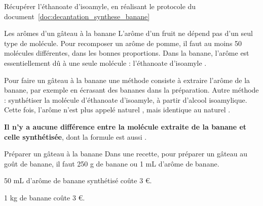 \mesure Récupérer l'éthanoate d'isoamyle, en réalisant le protocole du document~\ref{doc:decantation_synthese_banane}


\bigskip
\begin{doc}{Les arômes d'un gâteau à la banane}
  L'arôme d'un fruit ne dépend pas d'un seul type de molécule.
  Pour recomposer un arôme de pomme, il faut au moins 50 molécules différentes, dans les bonnes proportions.
  Dans la banane, l'arôme est essentiellement dû à une seule molécule : l'éthanoate d'isoamyle .
  
  Pour faire un gâteau à la banane une méthode consiste à extraire l'arôme de la banane, par exemple en écrasant des bananes dans la préparation.
  Autre méthode : synthétiser la molécule d'éthanoate d'isoamyle, à partir d'alcool isoamylique.
  Cette fois, l'arôme n'est plus appelé \og naturel \fg, mais \og identique au naturel \fg.
  
  \textbf{Il n'y a aucune différence entre la molécule extraite de la banane et celle synthétisée}, dont la formule est aussi .
\end{doc}


\newpage
\begin{doc}{Préparer un gâteau à la banane}
  Dans une recette, pour préparer un gâteau au goût de banane, il faut 250 g de banane ou 1 mL d'arôme de banane.
  
  \begin{donnees}
    \item 50 mL d'arôme de banane synthétisé coûte 3 \euro.
    \item 1 kg de banane coûte 3 \euro.
  \end{donnees}
\end{doc}

